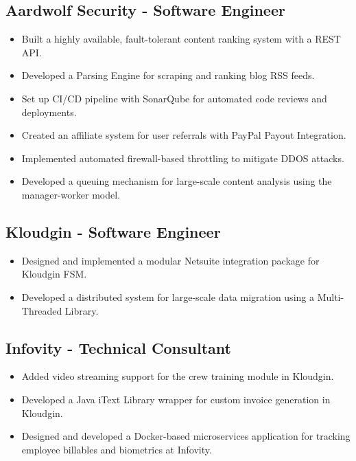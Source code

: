 \documentclass[11pt]{article}
\begin{document}
\subsection{\textbf{Aardwolf Security} - Software Engineer  }
\begin{itemize}
    \item Built a highly available, fault-tolerant content ranking system with a REST API.
    \item Developed a Parsing Engine for scraping and ranking blog RSS feeds.
    \item Set up CI/CD pipeline with SonarQube for automated code reviews and deployments.
    \item Created an affiliate system for user referrals with PayPal Payout Integration.
    \item Implemented automated firewall-based throttling to mitigate DDOS attacks.
    \item Developed a queuing mechanism for large-scale content analysis using the manager-worker model.
\end{itemize}

\subsection{\textbf{Kloudgin} - Software Engineer  }
\begin{itemize}
    \item Designed and implemented a modular Netsuite integration package for Kloudgin FSM.
    \item Developed a distributed system for large-scale data migration using a Multi-Threaded Library.
\end{itemize}
\subsection{\textbf{Infovity} - Technical Consultant  }
\begin{itemize}
    \item Added video streaming support for the crew training module in Kloudgin.
    \item Developed a Java iText Library wrapper for custom invoice generation in Kloudgin.
    \item Designed and developed a Docker-based microservices application for tracking employee billables and biometrics at Infovity.
\end{itemize}
\end{document}
